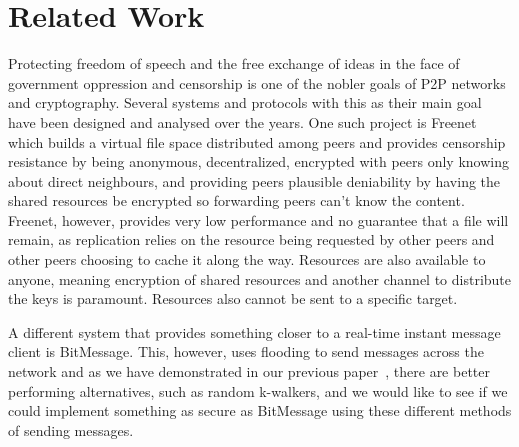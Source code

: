 \section{Related Work}
Protecting freedom of speech and the free exchange of ideas in the face of government oppression and censorship is one of the nobler goals of P2P networks and cryptography. Several systems and protocols with this as their main goal have been designed and analysed over the years. One such project is Freenet~\citep{freenet} which builds a virtual file space distributed among peers and provides censorship resistance by being anonymous, decentralized, encrypted with peers only knowing about direct neighbours, and providing peers plausible deniability by having the shared resources be encrypted so forwarding peers can't know the content. Freenet, however, provides very low performance and no guarantee that a file will remain, as replication relies on the resource being requested by other peers and other peers choosing to cache it along the way. Resources are also available to anyone, meaning encryption of shared resources and another channel to distribute the keys is paramount. Resources also cannot be sent to a specific target. 

A different system that provides something closer to a real-time instant message client is BitMessage\citep{bitmessage}. This, however, uses flooding to send messages across the network and as we have demonstrated in our previous paper~\citep{P2PN}, there are better performing alternatives, such as random k-walkers, and we would like to see if we could implement something as secure as BitMessage using these different methods of sending messages.